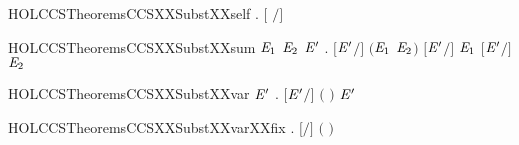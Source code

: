 \newcommand{\HOLCCSTheoremsCCSXXSubstXXrestr}{\UseVerbatim{HOLCCSTheoremsCCSXXSubstXXrestr}}
\begin{SaveVerbatim}{HOLCCSTheoremsCCSXXSubstXXself}
\HOLTokenTurnstile{} \HOLSymConst{\HOLTokenForall{}} . \ensuremath{[} \ensuremath{/}\ensuremath{]}  \HOLSymConst{\ensuremath{=}} 
\end{SaveVerbatim}
\newcommand{\HOLCCSTheoremsCCSXXSubstXXself}{\UseVerbatim{HOLCCSTheoremsCCSXXSubstXXself}}
\begin{SaveVerbatim}{HOLCCSTheoremsCCSXXSubstXXsum}
\HOLTokenTurnstile{} \HOLSymConst{\HOLTokenForall{}}\ensuremath{\HOLBoundVar{E}\sb{\mathrm{1}}} \ensuremath{\HOLBoundVar{E}\sb{\mathrm{2}}} \ensuremath{\HOLBoundVar{E}\sp{\prime{}}} . \ensuremath{[}\ensuremath{\HOLBoundVar{E}\sp{\prime{}}}\ensuremath{/}\ensuremath{]} \ensuremath{(}\ensuremath{\HOLBoundVar{E}\sb{\mathrm{1}}} \HOLSymConst{\ensuremath{+}} \ensuremath{\HOLBoundVar{E}\sb{\mathrm{2}}}\ensuremath{)} \HOLSymConst{\ensuremath{=}} \ensuremath{[}\ensuremath{\HOLBoundVar{E}\sp{\prime{}}}\ensuremath{/}\ensuremath{]} \ensuremath{\HOLBoundVar{E}\sb{\mathrm{1}}} \HOLSymConst{\ensuremath{+}} \ensuremath{[}\ensuremath{\HOLBoundVar{E}\sp{\prime{}}}\ensuremath{/}\ensuremath{]} \ensuremath{\HOLBoundVar{E}\sb{\mathrm{2}}}
\end{SaveVerbatim}
\newcommand{\HOLCCSTheoremsCCSXXSubstXXsum}{\UseVerbatim{HOLCCSTheoremsCCSXXSubstXXsum}}
\begin{SaveVerbatim}{HOLCCSTheoremsCCSXXSubstXXvar}
\HOLTokenTurnstile{} \HOLSymConst{\HOLTokenForall{}} \ensuremath{\HOLBoundVar{E}\sp{\prime{}}} . \ensuremath{[}\ensuremath{\HOLBoundVar{E}\sp{\prime{}}}\ensuremath{/}\ensuremath{]} \ensuremath{(} \ensuremath{)} \HOLSymConst{\ensuremath{=}}   \HOLSymConst{\ensuremath{=}}   \ensuremath{\HOLBoundVar{E}\sp{\prime{}}}   
\end{SaveVerbatim}
\newcommand{\HOLCCSTheoremsCCSXXSubstXXvar}{\UseVerbatim{HOLCCSTheoremsCCSXXSubstXXvar}}
\begin{SaveVerbatim}{HOLCCSTheoremsCCSXXSubstXXvarXXfix}
\HOLTokenTurnstile{} \HOLSymConst{\HOLTokenForall{}} . \ensuremath{[}\ensuremath{/}\ensuremath{]} \ensuremath{(} \ensuremath{)} \HOLSymConst{\ensuremath{=}} 
\end{SaveVerbatim}
